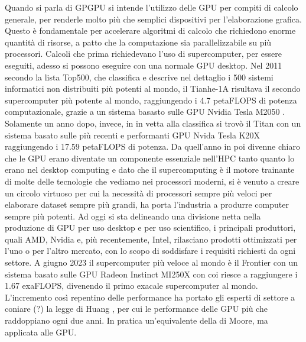Quando si parla di \gls{GPGPU} si intende l'utilizzo delle GPU per compiti di calcolo generale, per renderle molto più che semplici dispositivi per l'elaborazione grafica. Questo è fondamentale per accelerare algoritmi di calcolo che richiedono enorme quantità di risorse, a patto che la computazione sia parallelizzabile su più processori.
Calcoli che prima richiedevano l'uso di supercomputer, per essere eseguiti, adesso si possono eseguire con una normale GPU desktop. 
Nel 2011 secondo la lista Top500, che classifica e descrive nel dettaglio i 500 sistemi informatici non distribuiti più potenti al mondo, il Tianhe-1A risultava il secondo supercomputer più potente al mondo, raggiungendo i 4.7 petaFLOPS di potenza computazionale, grazie a un sistema basasto sulle GPU Nvidia Tesla M2050 \cite[]{Tianhe-1A:link}. Solamente un anno dopo, invece, in in vetta alla classifica si trovò il Titan \cite[]{Titan:link} con un sistema basato sulle più recenti e performanti GPU Nvida Tesla K20X raggiungendo i 17.59 petaFLOPS di potenza.
Da quell'anno in poi divenne chiaro che le GPU erano diventate un componente essenziale nell'HPC tanto quanto lo erano nel desktop computing e dato che il supercomputing è il motore trainante di molte delle tecnologie che vediamo nei processori moderni, si è venuto a creare un circolo virtuoso per cui la necessità di processori sempre più veloci per elaborare dataset sempre più grandi, ha porta l'industria a produrre computer sempre più potenti. Ad oggi si sta delineando una divisione netta nella produzione di GPU per uso desktop e per uso scientifico, i principali produttori, quali AMD, Nvidia e, più recentemente, Intel, rilasciano prodotti ottimizzati per l'uno o per l'altro mercato, con lo scopo di soddisfare i requisiti richiesti da ogni settore. A giugno 2023 il supercomputer più veloce al mondo è il Frontier \cite[]{Frontier:link} con un sistema basato sulle GPU Radeon Instinct MI250X con coi riesce a raggiungere i 1.67 exaFLOPS, divenendo il primo exacale supercomputer al mondo. L'incremento così repentino delle performance ha portato gli esperti di settore a coniare (?) la legge di Huang \cite[]{Huang:law}, per cui le performance delle GPU più che raddoppiano ogni due anni. In pratica un'equivalente della di Moore, ma applicata alle GPU.

